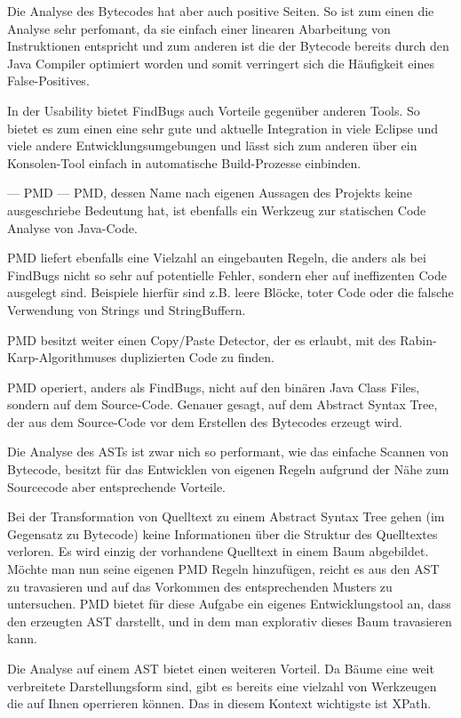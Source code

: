 Die Analyse des Bytecodes hat aber auch positive Seiten. So ist zum einen die Analyse sehr perfomant, da sie einfach einer linearen Abarbeitung von Instruktionen entspricht und zum anderen ist die der Bytecode bereits durch den Java Compiler optimiert worden und somit verringert sich die Häufigkeit eines False-Positives.

In der Usability bietet FindBugs auch Vorteile gegenüber anderen Tools. So bietet es zum einen eine sehr gute und aktuelle Integration in viele Eclipse und viele andere Entwicklungsumgebungen und lässt sich zum anderen über ein Konsolen-Tool einfach in automatische Build-Prozesse einbinden.


--- PMD ---
PMD, dessen Name nach eigenen Aussagen des Projekts keine ausgeschriebe Bedeutung hat, ist ebenfalls ein Werkzeug zur statischen Code Analyse von Java-Code. 

PMD liefert ebenfalls eine Vielzahl an eingebauten Regeln, die anders als bei FindBugs nicht so sehr auf potentielle Fehler, sondern eher auf ineffizenten Code ausgelegt sind. Beispiele hierfür sind z.B. leere Blöcke, toter Code oder die falsche Verwendung von Strings und StringBuffern. 

PMD besitzt weiter einen Copy/Paste Detector, der es erlaubt, mit des Rabin-Karp-Algorithmuses duplizierten Code zu finden.

PMD operiert, anders als FindBugs, nicht auf den binären Java Class Files, sondern auf dem Source-Code. Genauer gesagt, auf dem Abstract Syntax Tree, der aus dem Source-Code vor dem Erstellen des Bytecodes erzeugt wird. 

Die Analyse des ASTs ist zwar nich so performant, wie das einfache Scannen von Bytecode, besitzt für das Entwicklen von eigenen Regeln aufgrund der Nähe zum Sourcecode aber entsprechende Vorteile.

Bei der Transformation von Quelltext zu einem Abstract Syntax Tree gehen (im Gegensatz zu Bytecode) keine Informationen über die Struktur des Quelltextes verloren. Es wird einzig der vorhandene Quelltext in einem Baum abgebildet. 
Möchte man nun seine eigenen PMD Regeln hinzufügen, reicht es aus den AST zu travasieren und auf das Vorkommen des entsprechenden Musters zu untersuchen. PMD bietet für diese Aufgabe ein eigenes Entwicklungstool an, dass den erzeugten AST darstellt, und in dem man explorativ dieses Baum travasieren kann.


Die Analyse auf einem AST bietet einen weiteren Vorteil. Da Bäume eine weit verbreitete Darstellungsform sind, gibt es bereits eine vielzahl von Werkzeugen die auf Ihnen operrieren können. Das in diesem Kontext wichtigste ist XPath.

